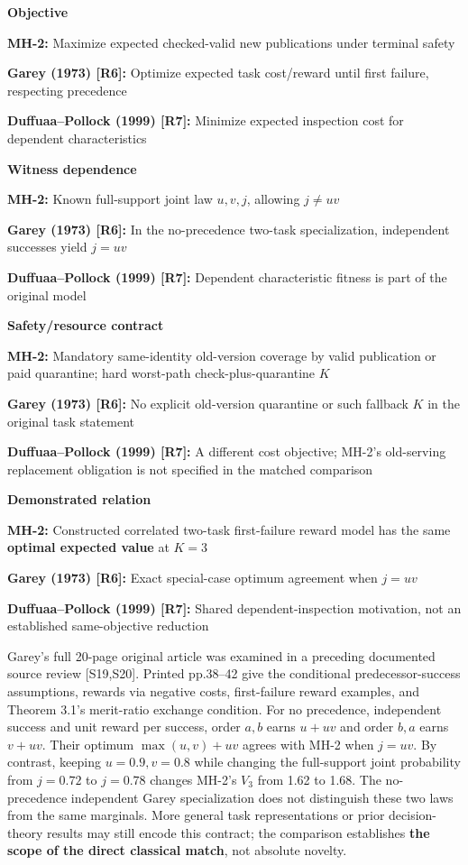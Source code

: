 \documentclass[
  10pt,
  american,
  a4paper,
]{article}
\begin{document}
\textbf{Objective}

\textbf{MH-2:} Maximize expected checked-valid new publications under
terminal safety

\textbf{Garey (1973) {[}R6{]}:} Optimize expected task cost/reward until
first failure, respecting precedence

\textbf{Duffuaa--Pollock (1999) {[}R7{]}:} Minimize expected inspection
cost for dependent characteristics

\textbf{Witness dependence}

\textbf{MH-2:} Known full-support joint law \(u,v,j\), allowing
\(j\ne uv\)

\textbf{Garey (1973) {[}R6{]}:} In the no-precedence two-task
specialization, independent successes yield \(j=uv\)

\textbf{Duffuaa--Pollock (1999) {[}R7{]}:} Dependent characteristic
fitness is part of the original model

\textbf{Safety/resource contract}

\textbf{MH-2:} Mandatory same-identity old-version coverage by valid
publication or paid quarantine; hard worst-path check-plus-quarantine
\(K\)

\textbf{Garey (1973) {[}R6{]}:} No explicit old-version quarantine or
such fallback \(K\) in the original task statement

\textbf{Duffuaa--Pollock (1999) {[}R7{]}:} A different cost objective;
MH-2's old-serving replacement obligation is not specified in the
matched comparison

\textbf{Demonstrated relation}

\textbf{MH-2:} Constructed correlated two-task first-failure reward
model has the same \textbf{optimal expected value} at \(K=3\)

\textbf{Garey (1973) {[}R6{]}:} Exact special-case optimum agreement
when \(j=uv\)

\textbf{Duffuaa--Pollock (1999) {[}R7{]}:} Shared dependent-inspection
motivation, not an established same-objective reduction

Garey's full 20-page original article was examined in a preceding
documented source review {[}S19,S20{]}. Printed pp.38--42 give the
conditional predecessor-success assumptions, rewards via negative costs,
first-failure reward examples, and Theorem 3.1's merit-ratio exchange
condition. For no precedence, independent success and unit reward per
success, order \(a,b\) earns \(u+uv\) and order \(b,a\) earns \(v+uv\).
Their optimum \(\max(u,v)+uv\) agrees with MH-2 when \(j=uv\). By
contrast, keeping \(u=0.9,v=0.8\) while changing the full-support joint
probability from \(j=0.72\) to \(j=0.78\) changes MH-2's \(V_3\) from
1.62 to 1.68. The no-precedence independent Garey specialization does
not distinguish these two laws from the same marginals. More general
task representations or prior decision-theory results may still encode
this contract; the comparison establishes \textbf{the scope of the
direct classical match}, not absolute novelty.
\end{document}
